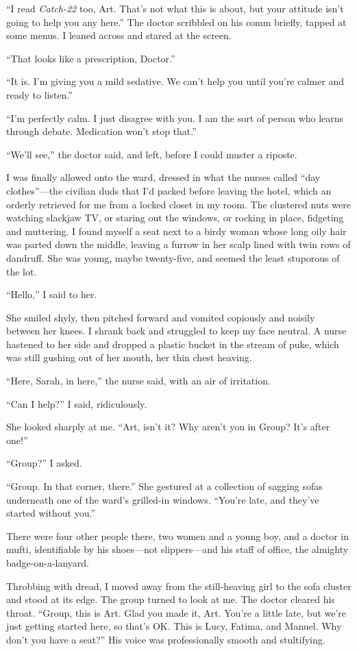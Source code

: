 “I read \emph{Catch-22} too, Art. That’s not what this is about,
but your attitude isn’t going to help you any here.” The doctor
scribbled on his comm briefly, tapped at some menus. I leaned
across and stared at the screen.

“That looks like a prescription, Doctor.”

“It is. I’m giving you a mild sedative. We can’t help you until
you’re calmer and ready to listen.”

“I’m perfectly calm. I just disagree with you. I am the sort of
person who learns through debate. Medication won’t stop that.”

“We’ll see,” the doctor said, and left, before I could muster a
riposte.

I was finally allowed onto the ward, dressed in what the nurses
called “day clothes”—the civilian duds that I’d packed before
leaving the hotel, which an orderly retrieved for me from a locked
closet in my room. The clustered nuts were watching slackjaw TV, or
staring out the windows, or rocking in place, fidgeting and
muttering. I found myself a seat next to a birdy woman whose long
oily hair was parted down the middle, leaving a furrow in her scalp
lined with twin rows of dandruff. She was young, maybe twenty-five,
and seemed the least stuporous of the lot.

“Hello,” I said to her.

She smiled shyly, then pitched forward and vomited copiously and
noisily between her knees. I shrank back and struggled to keep my
face neutral. A nurse hastened to her side and dropped a plastic
bucket in the stream of puke, which was still gushing out of her
mouth, her thin chest heaving.

“Here, Sarah, in here,” the nurse said, with an air of irritation.

“Can I help?” I said, ridiculously.

She looked sharply at me. “Art, isn’t it? Why aren’t you in Group?
It’s after one!”

“Group?” I asked.

“Group. In that corner, there.” She gestured at a collection of
sagging sofas underneath one of the ward’s grilled-in windows.
“You’re late, and they’ve started without you.”

There were four other people there, two women and a young boy, and
a doctor in mufti, identifiable by his shoes—not slippers—and his
staff of office, the almighty badge-on-a-lanyard.

Throbbing with dread, I moved away from the still-heaving girl to
the sofa cluster and stood at its edge. The group turned to look at
me. The doctor cleared his throat. “Group, this is Art. Glad you
made it, Art. You’re a little late, but we’re just getting started
here, so that’s OK. This is Lucy, Fatima, and Manuel. Why don’t you
have a seat?” His voice was professionally smooth and stultifying.

